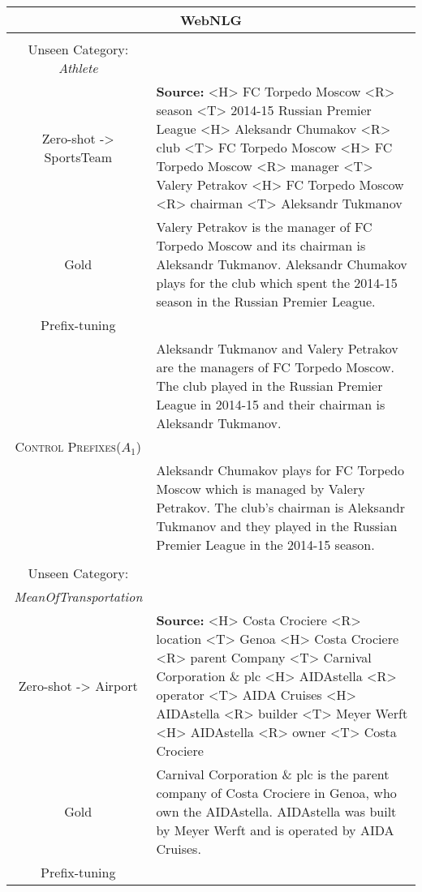 \documentclass[11pt]{article}
\newcommand{\control}{\textsc{Control Prefixes}\xspace}
\newcommand{\bl}[1]{{\color{blue}  #1}}
\newcommand{\rd}[1]{{\color{red}  #1}}
\begin{document}
\begin{table*}[bth!]
\scriptsize
  \centering
  \renewcommand{\arraystretch}{1.1}
  \begin{tabular}{c|p{}}
  \hline
    \multicolumn{2}{c}{\textbf{WebNLG}} \\  \hline
    
 \\ Unseen Category: \bl{\textit{Athlete}}\\
  Zero-shot -> \rd{SportsTeam} & \textbf{Source:} <H> FC Torpedo Moscow <R> season <T> 2014-15 Russian Premier League <H> Aleksandr Chumakov <R> club <T> FC Torpedo Moscow <H> FC Torpedo Moscow <R> manager <T> Valery Petrakov <H> FC Torpedo Moscow <R> chairman <T> Aleksandr Tukmanov

  \\ \hline
Gold & Valery Petrakov is the manager of FC Torpedo Moscow and its chairman is Aleksandr Tukmanov. Aleksandr Chumakov plays for the club which spent the 2014-15 season in the Russian Premier League.\\ \hline
Prefix-tuning\\

& Aleksandr Tukmanov and Valery Petrakov are the managers of FC Torpedo Moscow. The club played in the Russian Premier League in 2014-15 and their chairman is Aleksandr Tukmanov. \\\hline
\control ($A_{1}$)\\& Aleksandr Chumakov plays for FC Torpedo Moscow which is managed by Valery Petrakov. The club's chairman is Aleksandr Tukmanov and they played in the Russian Premier League in the 2014-15 season. \\ \midrule \hline

    \\ Unseen Category:\\ \bl{\textit{MeanOfTransportation}}\\
  Zero-shot -> \rd{Airport} & \textbf{Source:} <H> Costa Crociere <R> location <T> Genoa <H> Costa Crociere <R> parent Company <T> Carnival Corporation \& plc <H> AIDAstella <R> operator <T> AIDA Cruises <H> AIDAstella <R> builder <T> Meyer Werft <H> AIDAstella <R> owner <T> Costa Crociere

  \\ \hline
Gold & Carnival Corporation \& plc is the parent company of Costa Crociere in Genoa, who own the AIDAstella. AIDAstella was built by Meyer Werft and is operated by AIDA Cruises.\\ \hline
Prefix-tuning\\


\end{tabular}
\end{table*}
\end{document}
